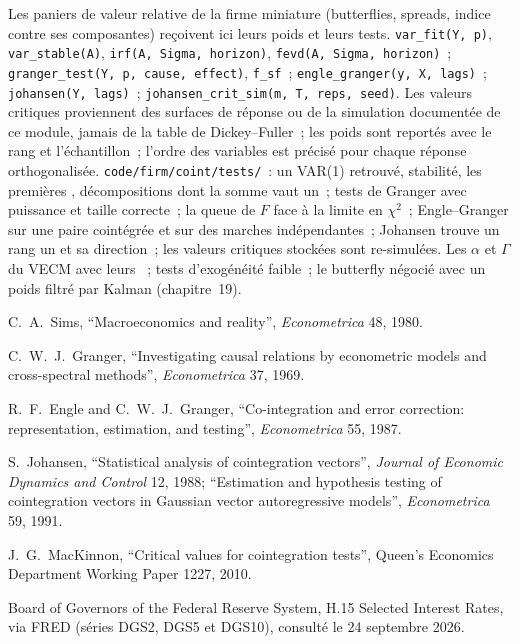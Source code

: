 \begin{build}
 Les paniers de valeur relative de la firme miniature (butterflies, spreads, indice contre ses composantes) reçoivent ici leurs poids et leurs tests.
 \texttt{var\_fit(Y, p)}, \texttt{var\_stable(A)}, \texttt{irf(A, Sigma, horizon)}, \texttt{fevd(A, Sigma, horizon)}~;
\texttt{granger\_test(Y, p, cause, effect)}, \texttt{f\_sf}~; \texttt{engle\_granger(y, X, lags)}~; \texttt{johansen(Y, lags)}~; \texttt{johansen\_crit\_sim(m, T, reps, seed)}.
 Les valeurs critiques proviennent des surfaces de réponse ou de la simulation documentée de ce module, jamais de la table de Dickey--Fuller~; les poids sont reportés
avec le rang et l'échantillon~; l'ordre des variables est précisé pour chaque réponse orthogonalisée.
 \texttt{code/firm/coint/tests/}~: un VAR(1) retrouvé, stabilité, les premières , décompositions dont la somme vaut un~; tests de Granger avec
puissance et taille correcte~; la queue de $F$ face à la limite en $\chi^2$~; Engle--Granger sur une paire cointégrée et sur des marches indépendantes~; Johansen trouve un rang un et sa
direction~; les valeurs critiques stockées sont re-simulées.
 Les $\alpha$ et $\Gamma$ du VECM avec leurs ~; tests d'exogénéité faible~; le butterfly négocié avec un poids filtré par Kalman (chapitre~19).
\end{build}

\begin{omsources}
\item C.~A.~Sims, ``Macroeconomics and reality'', \emph{Econometrica} 48, 1980.
\item C.~W.~J.~Granger, ``Investigating causal relations by econometric models and cross-spectral methods'', \emph{Econometrica} 37, 1969.
\item R.~F.~Engle and C.~W.~J.~Granger, ``Co-integration and error correction: representation, estimation, and testing'', \emph{Econometrica} 55, 1987.
\item S.~Johansen, ``Statistical analysis of cointegration vectors'', \emph{Journal of Economic Dynamics and Control} 12, 1988; ``Estimation and hypothesis
testing of cointegration vectors in Gaussian vector autoregressive models'', \emph{Econometrica} 59, 1991.
\item J.~G.~MacKinnon, ``Critical values for cointegration tests'', Queen's Economics Department Working Paper 1227, 2010.
\item Board of Governors of the Federal Reserve System, H.15 Selected Interest Rates, via FRED (séries DGS2, DGS5 et DGS10), consulté le 24 septembre 2026.
\end{omsources}

